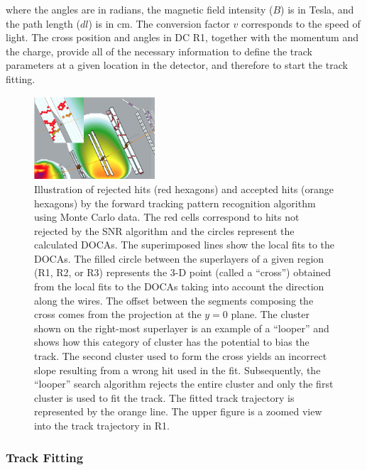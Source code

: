 \noindent
where the angles are in radians, the magnetic field intensity ($B$) is in Tesla, and the path length ($dl$) is in cm.
The conversion factor $v$ corresponds to the speed of light. The cross position and angles in DC R1, together with
the momentum and the charge, provide all of the necessary information to define the track parameters at a given
location in the detector, and therefore to start the track fitting.

\begin{figure}[t]
\centering
\includegraphics[width=0.4\textwidth]{pics/dcPattern13.png}
\caption{Illustration of rejected hits (red hexagons) and accepted hits (orange hexagons) by the forward tracking
  pattern recognition algorithm using Monte Carlo data. The red cells correspond to hits not rejected by the SNR
  algorithm and the circles represent the calculated DOCAs.  The superimposed lines show the local fits to the
  DOCAs. The filled circle between the superlayers of a given region (R1, R2, or R3) represents the 3-D point
  (called a ``cross'') obtained from the local fits to the DOCAs taking into account the direction along the wires. The
  offset between the segments composing the cross comes from the projection at the $y=0$ plane. The cluster shown
  on the right-most superlayer is an example of a ``looper'' and shows how this category of cluster has the potential
  to bias the track. The second cluster used to form the cross yields an incorrect slope resulting from a wrong hit
  used in the fit.  Subsequently, the ``looper'' search algorithm rejects the entire cluster and only the first cluster
  is used to fit the track. The fitted track trajectory is represented by the orange line. The upper figure is a zoomed
  view into the track trajectory in R1.}
\label{fig:dcsegs}
\end{figure}

\subsubsection{Track Fitting}
\label{sec-trackfitting}

